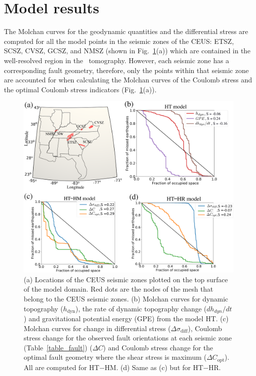 \documentclass[draft,linenumbers]{agujournal2018}
\begin{document}
\section{Model results}
The Molchan curves for the geodynamic quantities and the differential stress are computed for all the model points in the seismic zones of the CEUS: ETSZ, SCSZ, CVSZ, GCSZ, and NMSZ (shown in Fig.~\ref{model_results}(a)) which are contained in the well-resolved region in the~\citet{Biryol_2016} tomography. However, each seismic zone has a corresponding fault geometry, therefore, only the points within that seismic zone are accounted for when calculating the Molchan curves of the Coulomb stress and the optimal Coulomb stress indicators (Fig.~\ref{model_results}(a)). 
%
\begin{figure}[h!]
\centering
	\includegraphics[width=\linewidth]{figures/results_combined.png}
	\caption{(a) Locations of the CEUS seismic zones plotted on the top surface of the model domain. Red dots are the nodes of the mesh that belong to the CEUS seismic zones. %
(b) Molchan curves for dynamic topography ($h_{\text{dyn}}$), the rate of dynamic topography change ($dh_{dyn}/dt$) and gravitational potential energy (GPE) from the model HT. (c) Molchan curves for change in differential stress ($\Delta \sigma_{\text{diff}}$), Coulomb stress change for the observed fault orientations at each seismic zone (Table~\ref{table_fault}) ($\Delta C$) and Coulomb stress change for the optimal fault geometry where the shear stress is maximum ($\Delta C_{\text{opt}}$). All are computed for HT$-$HM. (d) Same as (c) but for HT$-$HR.}
	\label{model_results}
\end{figure}
\end{document}
